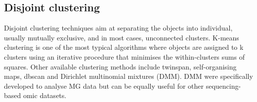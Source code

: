 \documentclass[
]{book}
\newenvironment{Shaded}{\begin{snugshade}}{\end{snugshade}}
\newcommand{\AttributeTok}[1]{\textcolor[rgb]{0.77,0.63,0.00}{#1}}
\newcommand{\CommentTok}[1]{\textcolor[rgb]{0.56,0.35,0.01}{\textit{#1}}}
\newcommand{\DecValTok}[1]{\textcolor[rgb]{0.00,0.00,0.81}{#1}}
\newcommand{\FunctionTok}[1]{\textcolor[rgb]{0.00,0.00,0.00}{#1}}
\newcommand{\NormalTok}[1]{#1}
\newcommand{\OtherTok}[1]{\textcolor[rgb]{0.56,0.35,0.01}{#1}}
\newcommand{\SpecialCharTok}[1]{\textcolor[rgb]{0.00,0.00,0.00}{#1}}
\newcommand{\StringTok}[1]{\textcolor[rgb]{0.31,0.60,0.02}{#1}}
\begin{document}
\hypertarget{disjoint-clustering}{%
\subsection{Disjoint clustering}\label{disjoint-clustering}}

Disjoint clustering techniques aim at separating the objects into individual, usually mutually exclusive, and in most cases, unconnected clusters. K-means clustering is one of the most typical algorithms where objects are assigned to k clusters using an iterative procedure that minimises the within-clusters sums of squares. Other available clustering methods include twinspan, self-organising maps, dbscan and Dirichlet multinomial mixtures (DMM). DMM were specifically developed to analyse MG data but can be equally useful for other sequencing-based omic datasets.

\begin{Shaded}
\end{Shaded}

\begin{Shaded}
\end{Shaded}
\end{document}
